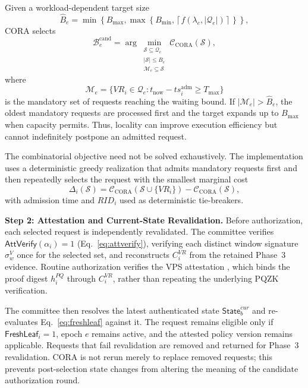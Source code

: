 \documentclass[lettersize,journal]{IEEEtran}
\begin{document}
Given a workload-dependent target size
\begin{equation}
\widehat{B}_e
=
\min\!\left\{
B_{\max},
\max\!\left\{
B_{\min},
\left\lceil
f(\lambda_e,|\mathcal{Q}_e|)
\right\rceil
\right\}
\right\},
\end{equation}
CORA selects
\begin{equation}
\mathcal{B}_e^{\mathrm{cand}}
=
\arg\min_{\substack{
\mathcal{S}\subseteq\mathcal{Q}_e\\
|\mathcal{S}|\leq\widehat{B}_e\\
\mathcal{M}_e\subseteq\mathcal{S}
}}
\mathcal{C}_{\mathrm{CORA}}(\mathcal{S}),
\end{equation}
where
\begin{equation}
\mathcal{M}_e=
\{VR_i\in\mathcal{Q}_e:
t_{\mathrm{now}}-ts_i^{\mathrm{adm}}\geq T_{\max}\}
\end{equation}
is the mandatory set of requests reaching the waiting bound. If
$|\mathcal{M}_e|>\widehat{B}_e$, the oldest mandatory requests are
processed first and the target expands up to $B_{\max}$ when capacity
permits. Thus, locality can improve execution efficiency but cannot
indefinitely postpone an admitted request.

The combinatorial objective need not be solved exhaustively. The
implementation uses a deterministic greedy realization that admits
mandatory requests first and then repeatedly selects the request with
the smallest marginal cost
\begin{equation}
\Delta_i(\mathcal{S})
=
\mathcal{C}_{\mathrm{CORA}}
(\mathcal{S}\cup\{VR_i\})
-
\mathcal{C}_{\mathrm{CORA}}(\mathcal{S}),
\end{equation}
with admission time and $RID_i$ used as deterministic tie-breakers.

\medskip
\noindent\textbf{Step 2: Attestation and Current-State Revalidation.}
Before authorization, each selected request is independently
revalidated. The committee verifies
\textcolor{e2}{$\mathsf{AttVerify}(\alpha_i)=1$
(Eq.~\eqref{eq:attverify}), verifying each distinct window signature
$\sigma_w^{V}$ once for the selected set,}
and reconstructs $C_i^{VR}$ from the retained Phase~3 evidence.
Routine authorization verifies the VPS attestation \textcolor{e2}{, which
binds the proof digest $h_i^{PQ}$ through $C_i^{VR}$,}
rather than repeating the underlying PQZK verification.

The committee then resolves the latest authenticated state
\textcolor{e1}{$\mathsf{State}_b^{cur}$ and re-evaluates
Eq.~\eqref{eq:freshleaf} against it.}
The request remains eligible only if
\textcolor{e1}{$\mathsf{FreshLeaf}_i=1$},
epoch $e$ remains active, and the attested policy version remains
applicable. Requests that fail revalidation are removed and returned
for Phase~3 revalidation. CORA is not rerun merely to replace removed
requests; this prevents post-selection state changes from altering the
meaning of the candidate authorization round.
\end{document}
